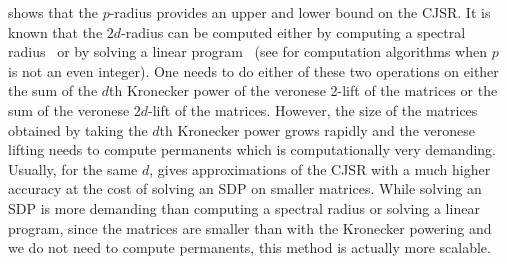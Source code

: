 \begin{myrem}
   shows that the $p$-radius provides an upper and lower bound on the CJSR.
  It is known that the $2d$-radius can be computed
  either by computing a spectral radius~\cite{blondel2005computationally}
  or by solving a linear program~\cite{parrilo2008approximation}
  (see \cite{ogura2016efficient} for computation algorithms when $p$ is not an even integer).
  One needs to do either of these two operations on
  either the sum of the $d$th Kronecker power of the veronese 2-lift of the matrices
  or the sum of the veronese $2d$-lift of the matrices.
  However, the size of the matrices obtained by taking the $d$th Kronecker power grows rapidly
  and the veronese lifting needs to compute permanents which is computationally very demanding.
  Usually, for the same $d$,  gives approximations of the CJSR with a much higher accuracy at the cost of solving an SDP on smaller matrices.
  While solving an SDP is more demanding than computing a spectral radius or solving a linear program, since the matrices are smaller than with the Kronecker powering
  and we do not need to compute permanents, this method is actually more scalable.
\end{myrem}
